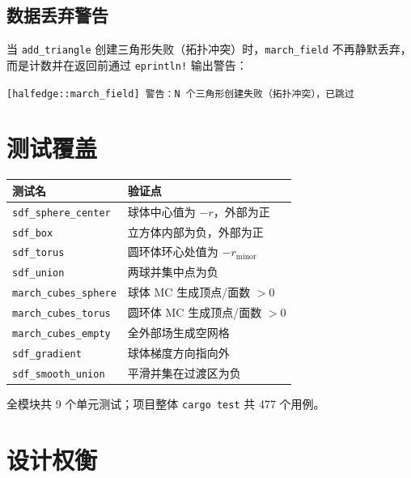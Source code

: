 \documentclass[11pt,a4paper]{article}
\begin{document}
\subsection{数据丢弃警告}

当 \texttt{add\_triangle} 创建三角形失败（拓扑冲突）时，\texttt{march\_field}
不再静默丢弃，而是计数并在返回前通过 \texttt{eprintln!} 输出警告：
\begin{center}
\texttt{[halfedge::march\_field] 警告：N 个三角形创建失败（拓扑冲突），已跳过}
\end{center}

\section{测试覆盖}

\begin{center}
\renewcommand{\arraystretch}{1.18}
\begin{tabular}{@{}ll@{}}
  \toprule
  \textbf{测试名} & \textbf{验证点} \\
  \midrule
  \texttt{sdf\_sphere\_center} & 球体中心值为 $-r$，外部为正 \\
  \texttt{sdf\_box} & 立方体内部为负，外部为正 \\
  \texttt{sdf\_torus} & 圆环体环心处值为 $-r_{\text{minor}}$ \\
  \texttt{sdf\_union} & 两球并集中点为负 \\
  \texttt{march\_cubes\_sphere} & 球体 MC 生成顶点/面数 $>0$ \\
  \texttt{march\_cubes\_torus} & 圆环体 MC 生成顶点/面数 $>0$ \\
  \texttt{march\_cubes\_empty} & 全外部场生成空网格 \\
  \texttt{sdf\_gradient} & 球体梯度方向指向外 \\
  \texttt{sdf\_smooth\_union} & 平滑并集在过渡区为负 \\
  \bottomrule
\end{tabular}
\end{center}

全模块共 9 个单元测试；项目整体 \texttt{cargo test} 共 477 个用例。

\section{设计权衡}
\end{document}
